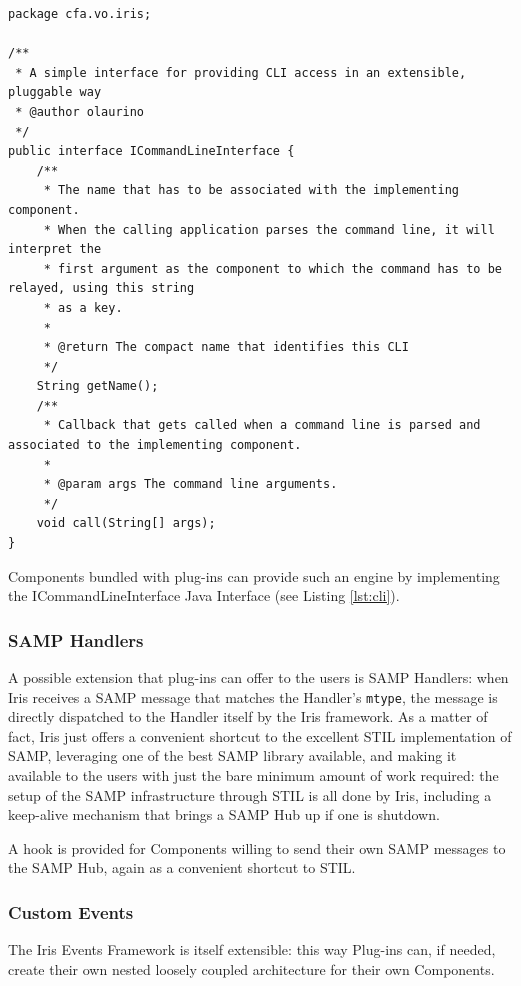 \documentclass[5p]{elsarticle}
\begin{document}
\begin{lstlisting}[style=java,
	caption={Every Iris component can expose a command line interface. Iris dispatches the command line arguments for the relative component to process.},
	label=lst:cli]
package cfa.vo.iris;

/**
 * A simple interface for providing CLI access in an extensible, pluggable way
 * @author olaurino
 */
public interface ICommandLineInterface {
    /**
     * The name that has to be associated with the implementing component.
     * When the calling application parses the command line, it will interpret the
     * first argument as the component to which the command has to be relayed, using this string
     * as a key.
     *
     * @return The compact name that identifies this CLI
     */
    String getName();
    /**
     * Callback that gets called when a command line is parsed and associated to the implementing component.
     *
     * @param args The command line arguments.
     */
    void call(String[] args);
}
\end{lstlisting}


Components bundled with plug-ins can provide such an engine by implementing the ICommandLineInterface Java Interface (see Listing \ref{lst:cli}).

\subsubsection{SAMP Handlers}
A possible extension that plug-ins can offer to the users is SAMP Handlers: when Iris receives a SAMP message that matches the Handler's \verb|mtype|, the message is directly dispatched to the Handler itself by the Iris framework. As a matter of fact, Iris just offers a convenient shortcut to the excellent STIL implementation of SAMP, leveraging one of the best SAMP library available, and making it available to the users with just the bare minimum amount of work required: the setup of the SAMP infrastructure through STIL is all done by Iris, including a keep-alive mechanism that brings a SAMP Hub up if one is shutdown.

A hook is provided for Components willing to send their own SAMP messages to the SAMP Hub, again as a convenient shortcut to STIL.

\subsubsection{Custom Events}
The Iris Events Framework is itself extensible: this way Plug-ins can, if needed, create their own nested loosely coupled architecture for their own Components.
\end{document}
